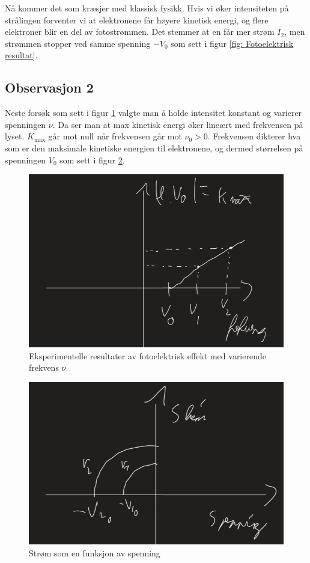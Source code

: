Nå kommer det som kræsjer med klassisk fysikk. Hvis vi øker intensiteten på strålingen forventer vi at elektronene får høyere kinetisk energi, og flere elektroner blir en del av fotostrømmen. Det stemmer at en får mer strøm $I_2$, men strømmen stopper ved samme spenning $-V_0$ som sett i figur \ref{fig: Fotoelektrisk resultat}. 

\subsection{Observasjon 2}
Neste forsøk som sett i figur \ref{fig: Fotoelektrisk resultat 2} valgte man å holde intensitet konstant og varierer spenningen $ν$. Da ser man at max kinetisk energi øker lineært med frekvensen på lyset. $K_{\text{max}}$ går mot null når frekvensen går mot $ν_0 > 0$. Frekvensen dikterer hva som er den maksimale kinetiske energien til elektronene, og dermed størrelsen på spenningen $V_0$ som sett i figur \ref{fig: fotoelektrisk resultat 2.1}.
\begin{figure}[h!]
  \centering
  \includegraphics[scale = .4]{Figures/Fotoelektrisk resultat 2.png}
  \caption{Eksperimentelle resultater av fotoelektrisk effekt med varierende frekvens $ν$}
  \label{fig: Fotoelektrisk resultat 2}
\end{figure}

\begin{figure}[h!]
    \centering
    \includegraphics[scale = .4]{Figures/fotoelektrisk resultat 2.1.png}
    \caption{Strøm som en funksjon av spenning}
    \label{fig: fotoelektrisk resultat 2.1}
  \end{figure}


